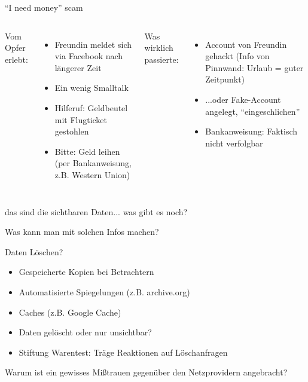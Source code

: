 \begin{frame}{"`I need money"' scam}
	\begin{columns}[t]
		Vom Opfer erlebt:
		\begin{itemize}
			\item Freundin meldet sich via Facebook nach längerer Zeit
			\item Ein wenig Smalltalk
			\item<2-> Hilferuf: Geldbeutel mit Flugticket gestohlen
			\item<2-> Bitte: Geld leihen (per Bankanweisung, z.B. Western Union)
		\end{itemize}
		Was wirklich passierte:
		\begin{itemize}
			\item<3-> Account von Freundin gehackt (Info von Pinnwand: Urlaub = guter Zeitpunkt)
			\item<3-> ...oder Fake-Account angelegt, "`eingeschlichen"'
			\item<3-> Bankanweisung: Faktisch nicht verfolgbar
		\end{itemize}
	\end{columns}
\end{frame}

\begin{frame}{das sind die sichtbaren Daten... was gibt es noch?}
\end{frame}

\begin{frame}{Was kann man mit solchen Infos machen?}
\end{frame}

\begin{frame}{Daten Löschen?}
	\begin{itemize}
		\item Gespeicherte Kopien bei Betrachtern
		\item Automatisierte Spiegelungen (z.B. archive.org)
		\item Caches (z.B. Google Cache)
		\item Daten gelöscht oder nur unsichtbar?
		\item Stiftung Warentest: Träge Reaktionen auf Löschanfragen
	\end{itemize}
\end{frame}

\begin{frame}{Warum ist ein gewisses Mißtrauen gegenüber den Netzprovidern angebracht?}
\end{frame}

